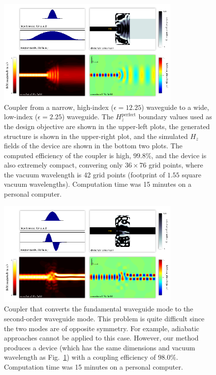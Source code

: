 \documentclass[letterpaper,10pt]{article}
\begin{document}
\begin{figure}[htb]
    \centering
    \includegraphics[width=0.8\textwidth]{1} 
    \caption{Coupler from a narrow, high-index ($\epsilon=12.25$) waveguide to
            a wide, low-index ($\epsilon=2.25$) waveguide. 
        The $H_z^\text{perfect}$ boundary values used as 
            the design objective are shown in the upper-left plots, 
            the generated structure is shown in the upper-right plot, and
            the simulated $H_z$ fields of the device are shown 
            in the bottom two plots.
        The computed efficiency of the coupler is high, $99.8\%$, and
            the device is also extremely compact, 
            convering only $36 \times 76$ grid points,
            where the vacuum wavelength is 42 grid points
            (footprint of $1.55$ square vacuum wavelengths).
        Computation time was 15 minutes on a personal computer.}
    \label{fig:fiber}
\end{figure}
\begin{figure}[htb]
    \centering
    \includegraphics[width=0.8\textwidth]{2} 
    \caption{Coupler that converts the fundamental waveguide mode to the
            second-order waveguide mode.
        This problem is quite difficult since the two modes are of 
            opposite symmetry.
        For example, adiabatic approaches cannot be applied to this case.
        However, our method produces a device 
            (which has the same dimensions and vacuum wavelength as 
            Fig.~\ref{fig:fiber})  
            with a coupling efficiency of $98.0\%$. 
        Computation time was 15 minutes on a personal computer.
        }
    \label{fig:mode}
\end{figure}
\end{document}
